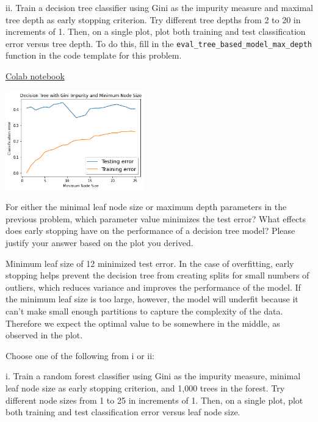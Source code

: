 ii. Train a decision tree classifier using Gini as the impurity measure and maximal tree depth as early stopping criterion. Try different tree depths from 2 to 20 in increments of 1. Then, on a single plot, plot both training and test classification error versus tree depth. To do this, fill in the \texttt{eval_tree_based_model_max_depth} function in the code template for this problem.

\begin{solution}
    \href{https://colab.research.google.com/drive/1wRuIx4mUDYKCiAoidlPLTfT9ON4VnHPi?usp=sharing}{Colab notebook}
 
    \includegraphics[width=0.45\textwidth]{images/2a.png}
\end{solution}

\problem[6]
For either the minimal leaf node size or maximum depth parameters in the previous problem, which parameter value minimizes the test error? What effects does early stopping have on the performance of a decision tree model?
Please justify your answer based on the plot you derived.

\begin{solution}
    Minimum leaf size of 12 minimized test error.
    In the case of overfitting, early stopping helps prevent the decision tree from creating splits for small numbers of outliers, which reduces variance and improves the performance of the model.
    If the minimum leaf size is too large, however, the model will underfit because it can't make small enough partitions to capture the complexity of the data.
    Therefore we expect the optimal value to be somewhere in the middle, as observed in the plot.
\end{solution}

\indent\problem[4] Choose one of the following from i or ii: \smallskip 

\noindent i. Train a random forest classifier using Gini as the impurity measure, minimal leaf node size as early stopping criterion, and 1,000 trees in the forest. Try different node sizes from 1 to 25 in increments of 1. Then, on a single plot, plot both training and test classification error versus
leaf node size.

